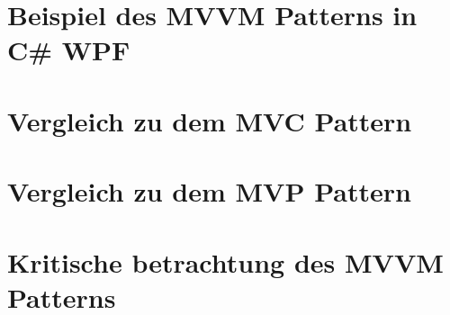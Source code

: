 \documentclass[titlepage=false,12pt]{scrreprt}
\begin{document}
	\chapter{Beispiel des MVVM Patterns in C\# WPF}


	\chapter{Vergleich zu dem MVC Pattern}


	\chapter{Vergleich zu dem MVP Pattern}


	\chapter{Kritische betrachtung des MVVM Patterns}
\end{document}
